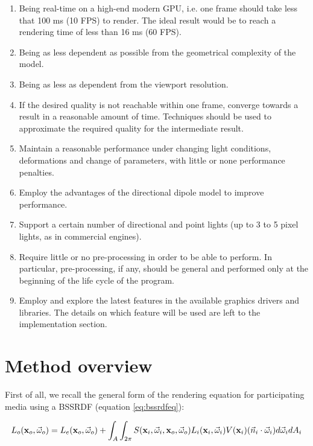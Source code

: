 \begin{enumerate}
	\item Being real-time on a high-end modern GPU, i.e. one frame should take less that 100 ms (10 FPS) to render. The ideal result would be to reach a rendering time of less than 16 ms (60 FPS).
	\item Being as less dependent as possible from the geometrical complexity of the model.
	\item Being as less as dependent from the viewport resolution.
	\item If the desired quality is not reachable within one frame, converge towards a result in a reasonable amount of time. Techniques should be used to approximate the required quality for the intermediate result. 
	\item Maintain a reasonable performance under changing light conditions, deformations and change of parameters, with little or none performance penalties.
	\item Employ the advantages of the directional dipole model to improve performance.
	\item Support a certain number of directional and point lights (up to 3 to 5 pixel lights, as in commercial engines\citep{unitymanual}).
	\item Require little or no pre-processing in order to be able to perform. In particular, pre-processing, if any, should be general and performed only at the beginning of the life cycle of the program. 
	\item Employ and explore the latest features in the available graphics drivers and libraries. The details on which feature will be used are left to the implementation section.
\end{enumerate}

\section{Method overview}
\label{sec:m_overv}
First of all, we recall the general form of the rendering equation for participating media using a BSSRDF (equation \ref{eq:bssrdfeq}):

\begin{equation*}
L_o(\mathbf{x}_o,\vec{\omega}_o) = L_e(\mathbf{x}_o,\vec{\omega}_o) + \int_A \int_{2\pi} S(\mathbf{x}_i, \vec{\omega}_i, \mathbf{x}_o, \vec{\omega}_o) L_i(\mathbf{x}_i,\vec{\omega}_i) V(\mathbf{x}_i) (\vec{n}_i \cdot \vec{\omega}_i) d\vec{\omega}_i d A_i
\end{equation*}

